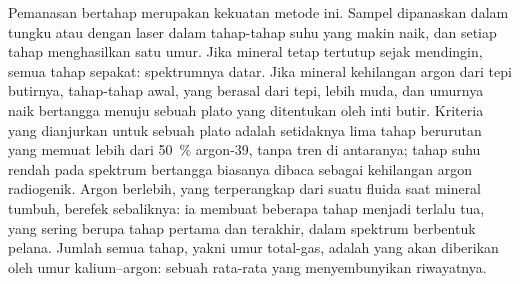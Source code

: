 Pemanasan bertahap merupakan kekuatan metode ini. Sampel dipanaskan dalam tungku
atau dengan laser dalam tahap-tahap suhu yang makin naik, dan setiap tahap menghasilkan satu umur.
Jika mineral tetap tertutup sejak mendingin, semua tahap sepakat: spektrumnya
datar. Jika mineral kehilangan argon dari tepi butirnya, tahap-tahap awal, yang
berasal dari tepi, lebih muda, dan umurnya naik bertangga menuju sebuah
plato yang ditentukan oleh inti butir. Kriteria yang dianjurkan untuk sebuah plato adalah
setidaknya lima tahap berurutan yang memuat lebih dari \qty{50}{\percent} argon-39,
tanpa tren di antaranya; tahap suhu rendah pada spektrum bertangga biasanya dibaca sebagai
kehilangan argon radiogenik. Argon berlebih, yang terperangkap dari suatu fluida saat mineral
tumbuh, berefek sebaliknya: ia membuat beberapa tahap menjadi terlalu tua, yang sering berupa tahap pertama
dan terakhir, dalam spektrum berbentuk pelana. Jumlah semua tahap, yakni umur total-gas, adalah
yang akan diberikan oleh umur kalium--argon: sebuah rata-rata
yang menyembunyikan riwayatnya.

